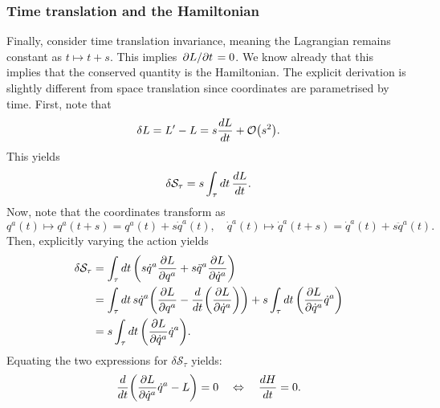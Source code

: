 \documentclass{article}
\begin{document}
\subsubsection{Time translation and the Hamiltonian}
Finally, consider time translation invariance, meaning the Lagrangian remains constant as $ t \mapsto t +s $. This implies $ \pdv*{L}{t} = 0 $. We know already that this implies that the conserved quantity is the Hamiltonian. The explicit derivation is slightly different from space translation since coordinates are parametrised by time. First, note that
\begin{equation}
	\delta L = L' - L = s \dv{L}{t} + \order{s^{2}}.
\end{equation}
This yields
\begin{equation}
	\delta \mathcal{S}_{\tau} = s \int_{\tau} \dd{t} \dv{L}{t}.
\end{equation}
Now, note that the coordinates transform as
\begin{equation}
	q^{a}(t) \longmapsto q^{a}(t+s) = q^{a}(t) + s \dot{q}^{a}(t), \quad \dot{q}^{a}(t) \longmapsto \dot{q}^{a}(t+s) = \dot{q}^{a}(t) + s \ddot{q}^{a}(t).
\end{equation}
Then, explicitly varying the action yields
\begin{align}
	\begin{split}
		\delta \mathcal{S}_{\tau} &= \int_{\tau} \dd{t} \qty(s\dot{q}^{a} \pdv{L}{q^{a}} + s \ddot{q}^{a} \pdv{L}{\dot{q}^{a}}) \\
		&= \int_{\tau} \dd{t} s\dot{q}^{a}\qty(\pdv{L}{q^{a}} - \dv{t}(\pdv{L}{\dot{q}^{a}})) + s \int_\tau \dd{t} \qty(\pdv{L}{\dot{q}^{a}} \dot{q}^{a}) \\
		&= s \int_\tau \dd{t} \qty(\pdv{L}{\dot{q}^{a}} \dot{q}^{a}).
	\end{split}
\end{align}
Equating the two expressions for $ \delta \mathcal{S}_{\tau} $ yields:
\begin{equation}
	\dv{t} \qty(\pdv{L}{\dot{q}^{a}} \dot{q}^{a} - L) = 0 \quad \Leftrightarrow \quad \dv{H}{t} = 0.
\end{equation}
\end{document}
